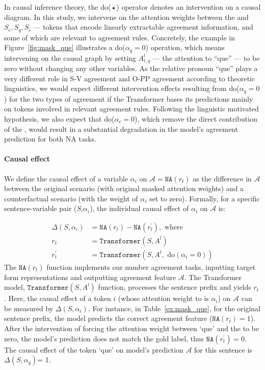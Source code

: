 In causal inference theory, the do(•) operator denotes an intervention on a causal diagram. In this study, we intervene on the attention weights between the \target and $S_c,S_q,S_i$ --- tokens that encode linearly extractable agreement information, and some of which are relevant to agreement rules. Concretely, the example in Figure~\ref{fig:mask_que} illustrates a do($\alpha_q = 0$) operation, which means intervening on the causal graph by setting $A^l_{t,q}$ --- the attention to ``que'' --- to be zero without changing any other variables. As the relative pronoun ``que'' plays a very different role in S-V agreement and O-PP agreement according to theoretic linguistics, we would expect different intervention effects resulting from do($\alpha_q = 0$) for the two types of agreement if the Transformer bases its predictions mainly on tokens involved in relevant agreement rules. Following the linguistic motivated hypothesis, we also expect that do($\alpha_c = 0$), which remove the direct contribution of the \cue, would result in a substantial degradation in the model's agreement prediction for both NA tasks. 

  

 \paragraph{Causal effect} We define the causal effect of a variable $\alpha_i$ on $\mathcal{A}=\texttt{NA}(r_t)$ as the difference in $\mathcal{A}$ between the original scenario (with original masked attention weights) and a counterfactual scenario (with the weight of $\alpha_i$ set to zero). Formally, for a specific sentence-variable pair ($S$,$\alpha_i$), the individual causal effect of $\alpha_i$ on $\mathcal{A}$ is:

\begin{align}
\Delta(S,\alpha_i) & = \texttt{NA}(r_t) - \texttt{NA}(r_t^\prime) \nonumber, \text{\ where} \\
r_t & = \texttt{Transformer}(S,A^{l}) \nonumber \\
r_t^\prime & = \texttt{Transformer}(S,A^{l}, \text{ do}(\alpha_i=0))
\label{eq:indiv_causal_effect}
\end{align}
The $\texttt{NA}(r_t)$ function implements our number agreement tasks, inputting target form representations and outputting agreement feature $\mathcal{A}$. The Transformer model, $\texttt{Transformer}(S,A^{l})$ function, processes the sentence prefix and yields $r_t$. Here, the causal effect of a token $i$ (whose attention weight to \target is $\alpha_i$) on $\mathcal{A}$ can be measured by $\Delta(S,\alpha_i)$. For instance, in Table~\ref{ex:mask_que}, for the original sentence prefix, the model predicts the correct agreement feature ($\texttt{NA}(r_t)=1$). After the intervention of forcing the attention weight between `que' and the \target to be zero, the model's prediction does not match the gold label, thus $\texttt{NA}(r_t^\prime)=0$. The causal effect of the token `que' on model's prediction $\mathcal{A}$ for this sentence is $\Delta(S,\alpha_q)$= 1.

